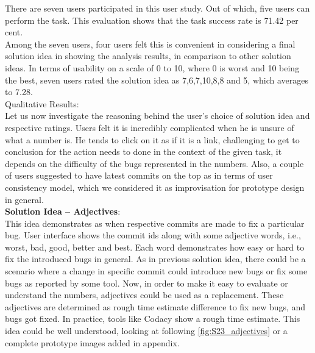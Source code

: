 There are seven users participated in this user study. Out of which, five users can perform the task. This evaluation shows that the task success rate is 71.42 per cent. \\

Among the seven users, four users felt this is convenient in considering a final solution idea in showing the analysis results, in comparison to other solution ideas. In terms of usability on a scale of 0 to 10, where 0 is worst and 10 being the best, seven users rated the solution idea as 7,6,7,10,8,8 and 5, which averages to 7.28. \\

Qualitative Results: \\

Let us now investigate the reasoning behind the user’s choice of solution idea and respective ratings. Users felt it is incredibly complicated when he is unsure of what a number is. He tends to click on it as if it is a link, challenging to get to conclusion for the action needs to done in the context of the given task, it depends on the difficulty of the bugs represented in the numbers. Also, a couple of users suggested to have latest commits on the top as in terms of user consistency model, which we considered it as improvisation for prototype design in general. \\

\textbf{Solution Idea – Adjectives}: \\

This idea demonstrates as when respective commits are made to fix a particular bug. User interface shows the commit ids along with some adjective words, i.e., worst, bad, good, better and best. Each word demonstrates how easy or hard to fix the introduced bugs in general. As in previous solution idea, there could be a scenario where a change in specific commit could introduce new bugs or fix some bugs as reported by some tool. Now, in order to make it easy to evaluate or understand the numbers, adjectives could be used as a replacement. These adjectives are determined as rough time estimate difference to fix new bugs, and bugs got fixed. In practice, tools like Codacy show a rough time estimate. This idea could be well understood, looking at following \autoref{fig:S23_adjectives} or a complete prototype images added in appendix. \\


